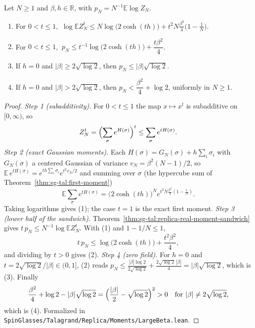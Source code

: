 \begin{theorem}[An upper bound on the quenched free energy; failure of the $q=0$ value at large $\beta$]\label{thm:sg-tal:replica-large-beta}
\leanok
{}
Let $N\ge1$ and $\beta,h\in\mathbb R$, with $p_N=N^{-1}\mathbb E\log Z_N$.
\begin{enumerate}
\item For $0<t\le1$, $\ \log\mathbb EZ_N^t\le N\log\bigl(2\cosh(th)\bigr)+t^2N\frac{\beta^2}4\bigl(1-\frac1N\bigr)$.
\item For $0<t\le1$, $\ p_N\le t^{-1}\log\bigl(2\cosh(th)\bigr)+\dfrac{t\beta^2}{4}$.
\item If $h=0$ and $|\beta|\ge2\sqrt{\log2}$, then $p_N\le|\beta|\sqrt{\log2}$.
\item If $h=0$ and $|\beta|>2\sqrt{\log2}$, then $p_N<\dfrac{\beta^2}4+\log2$, uniformly in $N\ge1$.
\end{enumerate}
\end{theorem}
\begin{proof}
\leanok
\emph{Step 1 (subadditivity).} For $0<t\le1$ the map $x\mapsto x^t$ is subadditive on $[0,\infty)$, so
\[
Z_N^t=\Bigl(\sum_\sigma e^{H(\sigma)}\Bigr)^t\le\sum_\sigma e^{tH(\sigma)}.
\]
\emph{Step 2 (exact Gaussian moments).} Each $H(\sigma)=G_N(\sigma)+h\sum_i\sigma_i$ with $G_N(\sigma)$ a centered Gaussian of variance $v_N=\beta^2(N-1)/2$, so
$\mathbb E\,e^{tH(\sigma)}=e^{th\sum_i\sigma_i}e^{t^2v_N/2}$ and summing over $\sigma$ (the hypercube sum of Theorem~\ref{thm:sg-tal:first-moment})
\[
\mathbb E\sum_\sigma e^{tH(\sigma)}=\bigl(2\cosh(th)\bigr)^Ne^{t^2N\frac{\beta^2}4(1-\frac1N)} .
\]
Taking logarithms gives (1); the case $t=1$ is the exact first moment.
\emph{Step 3 (lower half of the sandwich).} Theorem~\ref{thm:sg-tal:replica-real-moment-sandwich} gives $t\,p_N\le N^{-1}\log\mathbb EZ_N^t$. With (1) and $1-1/N\le1$,
\[
t\,p_N\le\log\bigl(2\cosh(th)\bigr)+\frac{t^2\beta^2}4 ,
\]
and dividing by $t>0$ gives (2).
\emph{Step 4 (zero field).} For $h=0$ and $t=2\sqrt{\log2}/|\beta|\in(0,1]$, (2) reads
$p_N\le\frac{|\beta|\log2}{2\sqrt{\log2}}+\frac{2\sqrt{\log2}\,|\beta|}4=|\beta|\sqrt{\log2}$, which is (3). Finally
\[
\frac{\beta^2}4+\log2-|\beta|\sqrt{\log2}=\Bigl(\frac{|\beta|}2-\sqrt{\log2}\Bigr)^2>0
\quad\text{for }|\beta|\ne2\sqrt{\log2},
\]
which is (4).
Formalized in \texttt{SpinGlasses/Talagrand/Replica/Moments/LargeBeta.lean}.
\end{proof}

